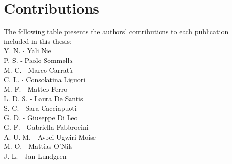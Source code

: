 \section{Contributions}
The following table presents the authors' contributions to each publication included in this thesis:\\
Y. N. - Yali Nie\\
P. S. - Paolo Sommella\\
M. C. - Marco Carratù\\
C. L. - Consolatina Liguori\\
M. F. - Matteo Ferro\\
L. D. S. - Laura De Santis\\
S. C. - Sara Cacciapuoti\\
G. D. - Giuseppe Di Leo\\
G. F. - Gabriella Fabbrocini\\
A. U. M. - Avoci Ugwiri Moise\\
M. O. - Mattias O'Nils\\
J. L. - Jan Lundgren


